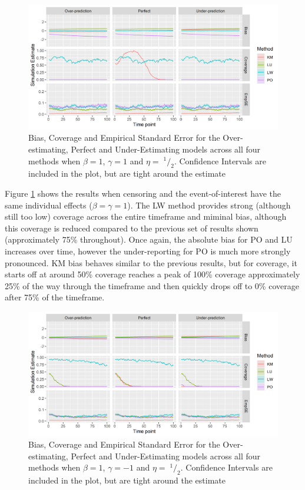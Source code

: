 \documentclass[12pt,PhD,twoside,openright]{muthesis}
\newcommand{\sfrac}[2]{\;^{#1}/_{#2}}
\begin{document}
\begin{figure}
\centering
\includegraphics{figure/IPCW_Logistic/MainPlot_b(1)_g(1)_e(0.5).png}
\caption{\label{fig:MainPlotg1}Bias, Coverage and Empirical Standard Error for the Over-estimating, Perfect and Under-Estimating models across all four methods when \(\beta=1\), \(\gamma=1\) and \(\eta=\sfrac{1}{2}\). Confidence Intervals are included in the plot, but are tight around the estimate}
\end{figure}
Figure \ref{fig:MainPlotg1} shows the results when censoring and the event-of-interest have the same individual effects (\(\beta=\gamma=1\)). The LW method provides strong (although still too low) coverage across the entire timeframe and miminal bias, although this coverage is reduced compared to the previous set of results shown (approximately 75\% throughout). Once again, the absolute bias for PO and LU increases over time, however the under-reporting for PO is much more strongly pronounced. KM bias behaves similar to the previous results, but for coverage, it starts off at around 50\% coverage reaches a peak of 100\% coverage approximately 25\% of the way through the timeframe and then quickly drops off to 0\% coverage after 75\% of the timeframe.
\begin{figure}
\centering
\includegraphics{figure/IPCW_Logistic/MainPlot_b(1)_g(-1)_e(0.5).png}
\caption{\label{fig:MainPlotg2}Bias, Coverage and Empirical Standard Error for the Over-estimating, Perfect and Under-Estimating models across all four methods when \(\beta=1\), \(\gamma=-1\) and \(\eta=\sfrac{1}{2}\). Confidence Intervals are included in the plot, but are tight around the estimate}
\end{figure}
\end{document}
